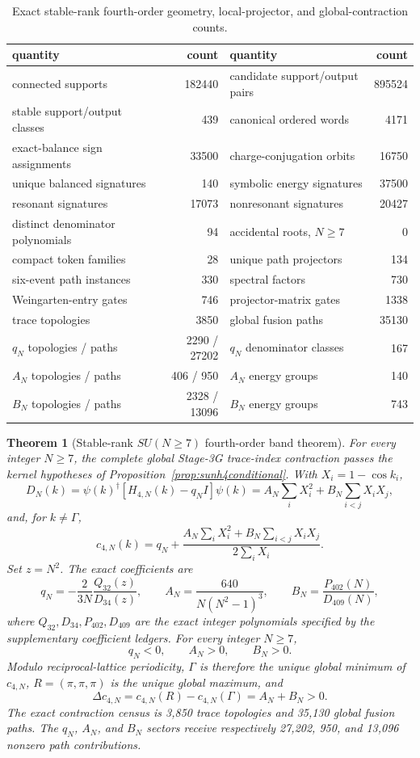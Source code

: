 \documentclass[11pt]{article}
\newtheorem{theorem}{Theorem}[section]
\begin{document}
\begin{table}[t]
\centering
\small
\begin{tabular}{lr@{\qquad}lr}
\toprule
quantity & count & quantity & count \\
\midrule
connected supports & 182440 & candidate support/output pairs & 895524 \\
stable support/output classes & 439 & canonical ordered words & 4171 \\
exact-balance sign assignments & 33500 & charge-conjugation orbits & 16750 \\
unique balanced signatures & 140 & symbolic energy signatures & 37500 \\
resonant signatures & 17073 & nonresonant signatures & 20427 \\
distinct denominator polynomials & 94 & accidental roots, $N\geq7$ & 0 \\
compact token families & 28 & unique path projectors & 134 \\
six-event path instances & 330 & spectral factors & 730 \\
Weingarten-entry gates & 746 & projector-matrix gates & 1338 \\
trace topologies & 3850 & global fusion paths & 35130 \\
$q_N$ topologies / paths & 2290 / 27202 & $q_N$ denominator classes & 167 \\
$A_N$ topologies / paths & 406 / 950 & $A_N$ energy groups & 140 \\
$B_N$ topologies / paths & 2328 / 13096 & $B_N$ energy groups & 743 \\
\bottomrule
\end{tabular}
\caption{Exact stable-rank fourth-order geometry, local-projector, and global-contraction counts.}
\label{tab:sunstable}
\end{table}

\begin{theorem}[Stable-rank $SU(N\geq7)$ fourth-order band theorem]
\label{thm:sunfull}
For every integer $N\geq7$, the complete global Stage-3G trace-index
contraction passes the kernel hypotheses of
Proposition~\ref{prop:sunh4conditional}. With $X_i=1-\cos k_i$,
\[
D_N(k)=\psi(k)^\dagger[H_{4,N}(k)-q_NI]\psi(k)
=A_N\sum_iX_i^2+B_N\sum_{i<j}X_iX_j,
\]
and, for $k\ne\Gamma$,
\[
c_{4,N}(k)=q_N+
\frac{A_N\sum_iX_i^2+B_N\sum_{i<j}X_iX_j}
{2\sum_iX_i}.
\]
Set $z=N^2$. The exact coefficients are
\[
q_N=-\frac{2}{3N}\frac{Q_{32}(z)}{D_{34}(z)},
\qquad
A_N=\frac{640}{N(N^2-1)^3},
\qquad
B_N=\frac{P_{402}(N)}{D_{409}(N)},
\]
where $Q_{32},D_{34},P_{402},D_{409}$ are the exact integer polynomials
specified by the supplementary coefficient ledgers. For every integer
$N\geq7$,
\[
q_N<0,\qquad A_N>0,\qquad B_N>0.
\]
Modulo reciprocal-lattice periodicity, $\Gamma$ is therefore the unique
global minimum of $c_{4,N}$, $R=(\pi,\pi,\pi)$ is the unique global maximum,
and
\[
\boxed{\Delta c_{4,N}=c_{4,N}(R)-c_{4,N}(\Gamma)=A_N+B_N>0.}
\]
The exact contraction census is 3,850 trace topologies and 35,130 global
fusion paths. The $q_N$, $A_N$, and $B_N$ sectors receive respectively
27,202, 950, and 13,096 nonzero path contributions.
\end{theorem}
\end{document}
